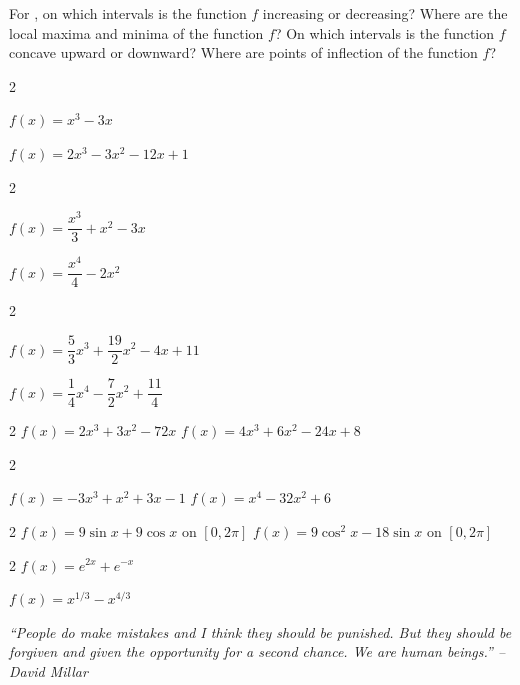 \documentclass{book}
\begin{document}
For , on which intervals is the function $f$ increasing or decreasing?  Where are the local maxima and minima of the function $f$? On which intervals is the function $f$ concave upward or downward?  Where are points of inflection of the function $f$?
\begin{enumerate}[!HW!]
\begin{multicols}{2}
\item\label{exer:firstderivativetest:start}   $f(x) = x^3 - 3x$ 
\item $f(x) = 2x^3-3x^2-12x+1$
\end{multicols}
\begin{multicols}{2}
\item $f(x) = \dfrac{x^3}{3}+x^2-3x$
\item $f(x) = \dfrac{x^4}{4} - 2x^2$
\end{multicols}
\begin{multicols}{2}
\item $f(x) = \dfrac{5}{3}x^{3} + \dfrac{19}{2}x^{2} - 4x + 11$ 
\item  $f(x) = \dfrac{1}{4}x^{4} - \dfrac{7}{2}x^{2} + \dfrac{11}{4}$
\end{multicols}
\begin{multicols}{2}
\itemspade $f(x)=2x^3+3x^2-72x$ 
\itemspade $f(x)=4x^3+6x^2-24x+8$ 
\end{multicols}
\begin{multicols}{2}
\item $f(x) = -3x^3 + x^2 + 3x - 1$
\itemspade $f(x)=x^4-32x^2+6$ 
\end{multicols}
\begin{multicols}{2}
\itemspade $f(x)=9\sin x + 9\cos x$ on $[0,2\pi]$ 
\itemspade $f(x)=9\cos^2 x - 18\sin x$ on $[0,2\pi]$ 
\end{multicols}
\begin{multicols}{2}
\itemspade $f(x)=e^{2x}+e^{-x}$  
\item\label{exer:firstderivativetest:stop} $f(x) = x^{1/3}-x^{4/3}$
\end{multicols}
\end{enumerate}
\pagebreak

\begin{center} 
\emph{``People do make mistakes and I think they should be punished. But they should be forgiven and given the opportunity for a second chance. We are human beings.'' -- David Millar}
\end{center}
\end{document}
